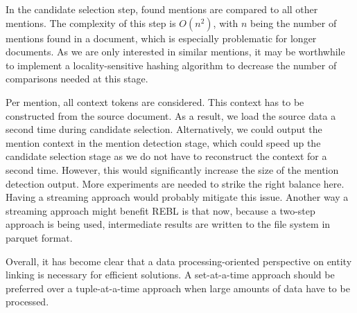 In the candidate selection step, found mentions are compared to all other mentions. The complexity of this step is $O(n^2)$, with $n$ being the number of mentions found in a document, which is especially problematic for longer documents. As we are only interested in similar mentions, it may be worthwhile to implement a locality-sensitive hashing algorithm to decrease the number of comparisons needed at this stage. 

Per mention, all context tokens are considered. This context has to be constructed from the source document. As a result, we load the source data a second time during candidate selection. Alternatively, we could output the mention context in the mention detection stage, which could speed up the candidate selection stage as we do not have to reconstruct the context for a second time. However, this would significantly increase the size of the mention detection output. More experiments are needed to strike the right balance here. 
Having a streaming approach would probably mitigate this issue. Another way a streaming approach might benefit REBL is that now, because a two-step approach is being used, intermediate results are written to the file system in parquet format. 

Overall, it has become clear that a data processing-oriented perspective on entity linking is necessary for efficient solutions. A set-at-a-time approach should be preferred over a tuple-at-a-time approach when large amounts of data have to be processed. 